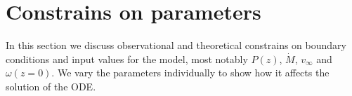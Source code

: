 \section{Constrains on parameters}
In this section we discuss observational and theoretical constrains on boundary conditions and input values for the model, most notably $P(z)$, $\dot M$, $v_\infty$ and $\omega(z=0)$. We vary the parameters individually to show how it affects the solution of the ODE.